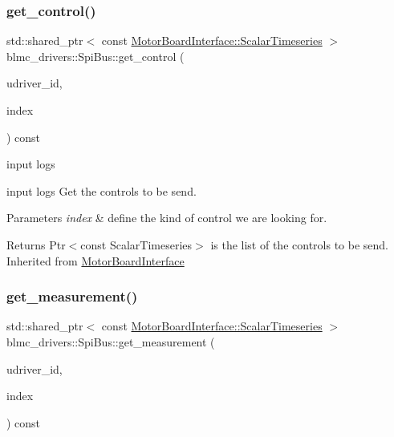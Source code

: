 \subsubsection{\texorpdfstring{get\+\_\+control()}{get\_control()}}
{\footnotesize\ttfamily std\+::shared\+\_\+ptr$<$ const \hyperlink{classblmc__drivers_1_1MotorBoardInterface_a14e237254ba495a66091ea3a3a33fa75}{Motor\+Board\+Interface\+::\+Scalar\+Timeseries} $>$ blmc\+\_\+drivers\+::\+Spi\+Bus\+::get\+\_\+control (\begin{DoxyParamCaption}\item[{const size\+\_\+t}]{udriver\+\_\+id,  }\item[{const \hyperlink{classblmc__drivers_1_1MotorBoardInterface_a82ed4d0fa527521707281396095a88ca}{Motor\+Board\+Interface\+::\+Control\+Index} \&}]{index }\end{DoxyParamCaption}) const\hspace{0.3cm}{\ttfamily [virtual]}}



input logs 

input logs Get the controls to be send.


\begin{DoxyParams}{Parameters}
{\em index} & define the kind of control we are looking for. \\
\hline
\end{DoxyParams}
\begin{DoxyReturn}{Returns}
Ptr$<$const Scalar\+Timeseries$>$ is the list of the controls to be send. Inherited from \hyperlink{classblmc__drivers_1_1MotorBoardInterface}{Motor\+Board\+Interface} 
\end{DoxyReturn}
\mbox{\label{classblmc__drivers_1_1SpiBus_a2f70f7c7d6a0fc22f03d0ca407f0c01b}} 
\subsubsection{\texorpdfstring{get\+\_\+measurement()}{get\_measurement()}}
{\footnotesize\ttfamily std\+::shared\+\_\+ptr$<$ const \hyperlink{classblmc__drivers_1_1MotorBoardInterface_a14e237254ba495a66091ea3a3a33fa75}{Motor\+Board\+Interface\+::\+Scalar\+Timeseries} $>$ blmc\+\_\+drivers\+::\+Spi\+Bus\+::get\+\_\+measurement (\begin{DoxyParamCaption}\item[{const size\+\_\+t}]{udriver\+\_\+id,  }\item[{const \hyperlink{classblmc__drivers_1_1MotorBoardInterface_a8e869cbdb9fcc872ba5a33813e0dfafb}{Motor\+Board\+Interface\+::\+Measurement\+Index} \&}]{index }\end{DoxyParamCaption}) const\hspace{0.3cm}{\ttfamily [virtual]}}



